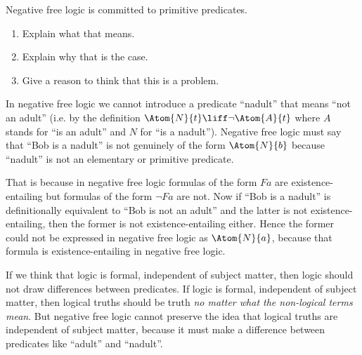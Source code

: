 \documentclass[../../../../include/open-logic-section]{subfiles}
\begin{document}
\begin{prob}
Negative free logic is committed to primitive predicates.
\begin{enumerate}
	\item Explain what that means.
	\item Explain why that is the case.
	\item Give a reason to think that this is a problem.
\end{enumerate}
\begin{ans}
\item In negative free logic we cannot introduce a predicate ``nadult'' 
	that means ``not an adult'' (i.e. by the definition $\Atom{N}{t} \liff 
	\lnot \Atom{A}{t}$ where $A$ stands for ``is an adult'' and 
	$N$ for ``is a nadult''). Negative free logic must say that 
	``Bob is a nadult'' is not genuinely of the form $\Atom{N}{b}$ because
	``nadult'' is not an elementary or primitive predicate.
\item That is because in negative free logic formulas of the form $Fa$ are
	existence-entailing but  formulas of the form $\lnot Fa$ are not. Now
	if ``Bob is a nadult'' is definitionally equivalent to
	``Bob is not an adult'' and the latter is not existence-entailing, 
	then the former is not existence-entailing either. Hence the former
	could not be expressed in negative free logic as $\Atom{N}{a}$, 
	because that formula is existence-entailing in negative free logic.
\item If we think that logic is formal, independent of subject matter,
	then logic should not draw differences between predicates. If logic is
	formal, independent of subject matter, then logical truths should be 
	truth \emph{no matter what the non-logical terms mean}. But negative
	free logic cannot preserve the idea that logical truths are 
	independent of subject matter, because it must make a difference
	between predicates like ``adult'' and ``nadult''. 
\end{ans}
\end{prob}
\end{document}
